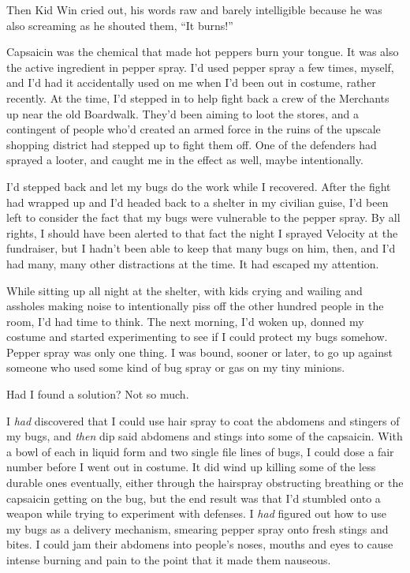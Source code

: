 Then Kid Win cried out, his words raw and barely intelligible because he was also screaming as he shouted them, ``It burns!''



Capsaicin was the chemical that made hot peppers burn your tongue.  It was also the active ingredient in pepper spray.  I'd used pepper spray a few times, myself, and I'd had it accidentally used on me when I'd been out in costume, rather recently.  At the time, I'd stepped in to help fight back a crew of the Merchants up near the old Boardwalk.  They'd been aiming to loot the stores, and a contingent of people who'd created an armed force in the ruins of the upscale shopping district had stepped up to fight them off.  One of the defenders had sprayed a looter, and caught me in the effect as well, maybe intentionally.



I'd stepped back and let my bugs do the work while I recovered.  After the fight had wrapped up and I'd headed back to a shelter in my civilian guise, I'd been left to consider the fact that my bugs were vulnerable to the pepper spray.  By all rights, I should have been alerted to that fact the night I sprayed Velocity at the fundraiser, but I hadn't been able to keep that many bugs on him, then, and I'd had many, many other distractions at the time.  It had escaped my attention.



While sitting up all night at the shelter, with kids crying and wailing and assholes making noise to intentionally piss off the other hundred people in the room, I'd had time to think.  The next morning, I'd woken up, donned my costume and started experimenting to see if I could protect my bugs somehow.  Pepper spray was only one thing.  I was bound, sooner or later, to go up against someone who used some kind of bug spray or gas on my tiny minions.



Had I found a solution?  Not so much.



I \emph{had} discovered that I could use hair spray to coat the abdomens and stingers of my bugs, and \emph{then} dip said abdomens and stings into some of the capsaicin. With a bowl of each in liquid form and two single file lines of bugs, I could dose a fair number before I went out in costume.  It did wind up killing some of the less durable ones eventually, either through the hairspray obstructing breathing or the capsaicin getting on the bug, but the end result was that I'd stumbled onto a weapon while trying to experiment with defenses.  I \emph{had} figured out how to use my bugs as a delivery mechanism, smearing pepper spray onto fresh stings and bites.  I could jam their abdomens into people's noses, mouths and eyes to cause intense burning and pain to the point that it made them nauseous.



